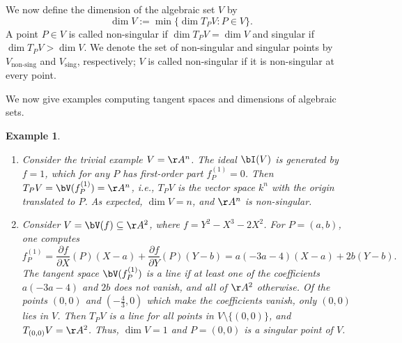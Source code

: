 \documentclass[12pt]{amsart}
\theoremstyle{plain}
\newtheorem{example}[theorem]{Example}
\begin{document}
We now define the dimension of the algebraic set $V$ by
$$\dim V := \min\{\dim T_PV : P \in V\}.$$
A point $P \in V$ is called non-singular if $\dim T_PV = \dim V$ and singular if $\dim T_P V > \dim V$.
We denote the set of non-singular and singular points by $V_{\text{non-sing}}$ and $V_{\text{sing}}$, respectively;
$V$ is called non-singular if it is non-singular at every point.

We now give examples computing tangent spaces and dimensions of algebraic sets.

\begin{example}
\begin{enumerate}
\item
Consider the trivial example $V = \AA^n$.
The ideal $\bI(V)$ is generated by $f = 1$, which for any $P$ has first-order part $f_P^{(1)} = 0$.
Then $T_PV = \bV(f_P^{(1)}) = \AA^n$, i.e., $T_PV$ is the vector space $k^n$ with the origin translated to $P$.
As expected, $\dim V = n$, and $\AA^n$ is non-singular.

\item
Consider $V = \bV(f) \subseteq \AA^2$, where $f = Y^2 - X^3 - 2X^2$.
For $P = (a, b)$, one computes
$$f_P^{(1)} = \frac{\partial f}{\partial X}(P)(X-a) + \frac{\partial f}{\partial Y}(P)(Y-b) = a(-3a-4)(X - a) + 2b(Y-b).$$ 
The tangent space $\bV(f_P^{(1)})$ is a line if at least one of the coefficients $a(-3a-4)$ and $2b$ does not vanish, and all of $\AA^2$ otherwise.
Of the points $(0, 0)$ and $(-\frac{4}{3}, 0)$ which make the coefficients vanish, only $(0, 0)$ lies in $V$.
Then $T_PV$ is a line for all points in $V\setminus\{(0, 0)\}$, and $T_{(0,0)}V = \AA^2$.
Thus, $\dim V = 1$ and $P = (0, 0)$ is a singular point of $V$.
\end{enumerate}
\end{example}
\end{document}
